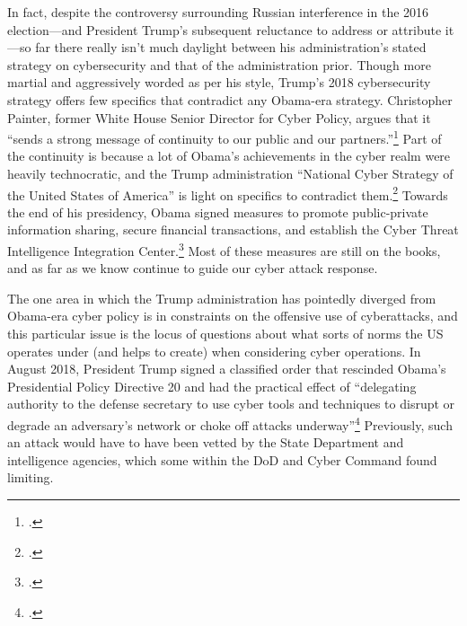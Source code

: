 \documentclass{report}
\begin{document}
\begin{refsegment}
In fact, despite the controversy surrounding Russian interference in the 2016 election---and President Trump's subsequent reluctance to address or attribute it---so far there really isn't much daylight between his administration's stated strategy on cybersecurity and that of the administration prior. Though more martial and aggressively worded as per his style, Trump's 2018 cybersecurity strategy offers few specifics that contradict any Obama-era strategy. Christopher Painter, former White House Senior Director for Cyber Policy, argues that it ``sends a strong message of continuity to our public and our partners.''\footcite[Painter also served at the State Department for six years as the Coordinator for Cyber Issues, which at the time was an Assistant Secretary level position. Since then, its status within the department has fluctuated wildly. Rex Tillerson, Trump's first Secretary of State, announced that he would abolish the office and merge it into State's Bureau of Economic Affairs. Then, just a few months later, he proposed creating an entirely new department bureau with a Senate-confirmed Assistant Secretary, possibly in response to criticism of his first decision. Though current Secretary Mike Pompeo appears to have more interest in cyber policy, the State Department still has not reestablished a high level cyber position.]{painter_white_2018} Part of the continuity is because a lot of Obama's achievements in the cyber realm were heavily technocratic, and the Trump administration ``National Cyber Strategy of the United States of America'' is light on specifics to contradict them.\footcite{guest_blogger_white_2018} Towards the end of his presidency, Obama signed measures to promote public-private information sharing, secure financial transactions, and establish the Cyber Threat Intelligence Integration Center.\footcite[Among other actions taken during the Obama presidency, these were sufficenct for PolitiFact to update its 2013 rating of his cyber-enforcement actions to ``Promise Kept.'']{carroll_obama_2016} Most of these measures are still on the books, and as far as we know continue to guide our cyber attack response.

The one area in which the Trump administration has pointedly diverged from Obama-era cyber policy is in constraints on the offensive use of cyberattacks, and this particular issue is the locus of questions about what sorts of norms the US operates under (and helps to create) when considering cyber operations. In August 2018, President Trump signed a classified order that rescinded Obama's Presidential Policy Directive 20 and had the practical effect of ``delegating authority to the defense secretary to use cyber tools and techniques to disrupt or degrade an adversary's network or choke off attacks underway''\footcite{nakashima_trump_2018} Previously, such an attack would have to have been vetted by the State Department and intelligence agencies, which some within the DoD and Cyber Command found limiting.


\end{refsegment}
\end{document}
